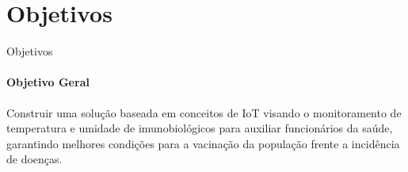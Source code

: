 \section{Objetivos}
\begin{frame}{Objetivos}
  \framesubtitle{\textcolor{fibeamer@black}{Objetivo Geral}}
  
  Construir uma solução baseada em conceitos de IoT visando o monitoramento de temperatura e umidade de imunobiológicos para auxiliar funcionários da saúde, garantindo melhores condições para a vacinação da população frente a incidência de doenças.
\end{frame}


